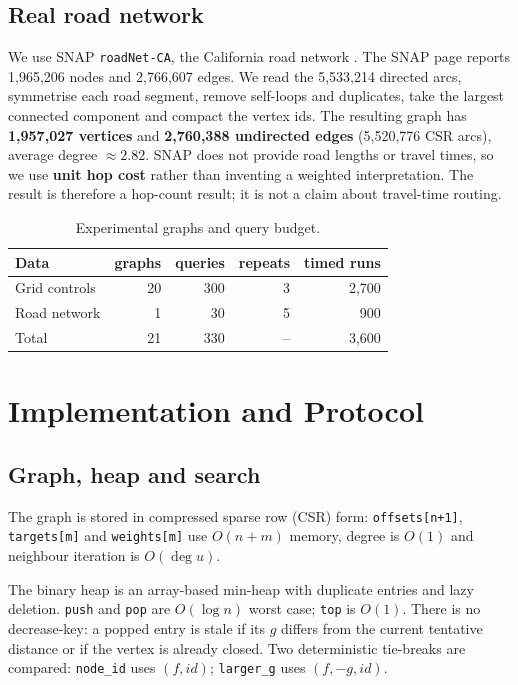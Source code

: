 \documentclass[conference,10pt]{IEEEtran}
\newcommand{\code}[1]{\texttt{#1}}
\begin{document}
\subsection{Real road network}
We use SNAP \code{roadNet-CA}, the California road network
\cite{snap}.  The SNAP page reports 1,965,206 nodes and 2,766,607 edges.  We read
the 5,533,214 directed arcs, symmetrise each road segment, remove self-loops and
duplicates, take the largest connected component and compact the vertex ids.
The resulting graph has \textbf{1,957,027 vertices} and \textbf{2,760,388
undirected edges} (5,520,776 CSR arcs), average degree $\approx 2.82$.
SNAP does not provide road lengths or travel times, so we use \textbf{unit hop
cost} rather than inventing a weighted interpretation.  The result is therefore
a hop-count result; it is not a claim about travel-time routing.

\begin{table}[!t]
\centering
\caption{Experimental graphs and query budget.}
\label{tab:data}
\footnotesize
\setlength{\tabcolsep}{3pt}
\begin{tabular}{lrrrr}
\toprule
Data & graphs & queries & repeats & timed runs\\
\midrule
Grid controls & 20 & 300 & 3 & 2,700\\
Road network & 1 & 30 & 5 & 900\\
\midrule
Total & 21 & 330 & -- & 3,600\\
\bottomrule
\end{tabular}
\end{table}

\section{Implementation and Protocol}
\label{sec:method}

\subsection{Graph, heap and search}
The graph is stored in compressed sparse row (CSR) form: \code{offsets[n+1]},
\code{targets[m]} and \code{weights[m]} use $O(n+m)$ memory, degree is $O(1)$
and neighbour iteration is $O(\deg u)$.

The binary heap is an array-based min-heap with duplicate entries and lazy
deletion.  \code{push} and \code{pop} are $O(\log n)$ worst case; \code{top} is
$O(1)$.  There is no decrease-key: a popped entry is stale if its $g$ differs
from the current tentative distance or if the vertex is already closed.  Two
deterministic tie-breaks are compared:
\code{node\_id} uses $(f,\mathit{id})$; \code{larger\_g} uses $(f,-g,\mathit{id})$.
\end{document}
